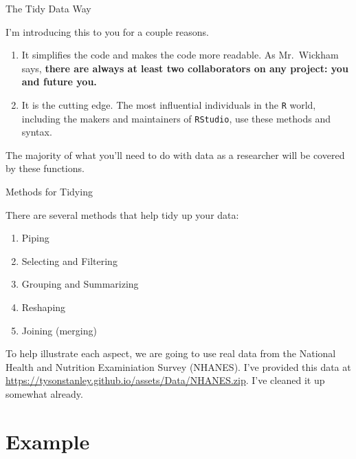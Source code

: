 \documentclass[ignorenonframetext,]{beamer}
\providecommand{\tightlist}{%
\setlength{\itemsep}{0pt}\setlength{\parskip}{0pt}}
\begin{document}
\begin{frame}[fragile]{The Tidy Data Way}

I'm introducing this to you for a couple reasons.

\begin{enumerate}
\def\labelenumi{\arabic{enumi}.}
\tightlist
\item
  It simplifies the code and makes the code more readable. As
  Mr.~Wickham says, \textbf{there are always at least two collaborators
  on any project: you and future you.}
\item
  It is the cutting edge. The most influential individuals in the
  \texttt{R} world, including the makers and maintainers of
  \texttt{RStudio}, use these methods and syntax.
\end{enumerate}

The majority of what you'll need to do with data as a researcher will be
covered by these functions.

\end{frame}

\begin{frame}{Methods for Tidying}

There are several methods that help tidy up your data:

\begin{enumerate}
\def\labelenumi{\arabic{enumi}.}
\tightlist
\item
  Piping
\item
  Selecting and Filtering
\item
  Grouping and Summarizing
\item
  Reshaping
\item
  Joining (merging)
\end{enumerate}

To help illustrate each aspect, we are going to use real data from the
National Health and Nutrition Examiniation Survey (NHANES). I've
provided this data at
\url{https://tysonstanley.github.io/assets/Data/NHANES.zip}. I've
cleaned it up somewhat already.

\end{frame}

\section{Example}\label{example}
\end{document}
